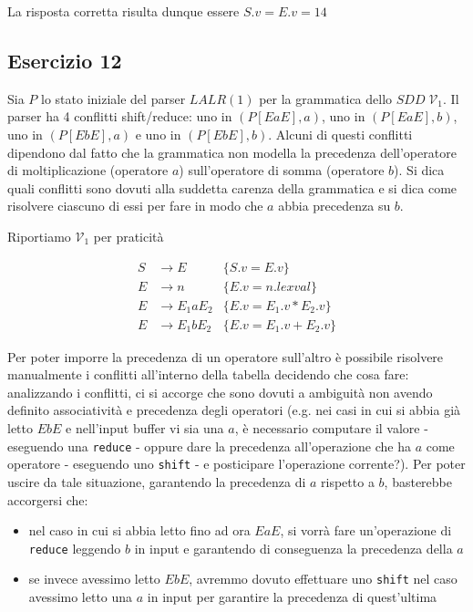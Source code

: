\documentclass[class=book, crop=false, oneside, 12pt]{standalone}
\begin{document}
La risposta corretta risulta dunque essere \(S.v = E.v = 14\)

\subsection{Esercizio 12}

Sia \(P\) lo  stato  iniziale  del  parser  \(LALR(1)\)  per  la  grammatica  dello  \(SDD \; \mathcal{V}_1\). Il parser ha 4  conflitti shift/reduce:  uno in \((P[EaE],a)\), uno in \((P[EaE],b)\), uno in \((P[EbE],a)\) e uno in \((P[EbE],b)\).   Alcuni di  questi  conflitti  dipendono  dal  fatto  che  la  grammatica  non  modella  la  precedenza  dell'operatore  di moltiplicazione (operatore \(a\)) sull'operatore di somma (operatore \(b\)).  Si dica quali conflitti sono dovuti alla suddetta carenza della grammatica e si dica come risolvere ciascuno di essi per fare in modo che \(a\) abbia precedenza su \(b\).

Riportiamo \(\mathcal{V}_1\) per praticità

\begin{align*}
    S &\to E &\{S.v = E.v\} \\
    E &\to n &\{E.v = n.lexval\} \\
    E &\to E_1 a E_2 &\{E.v = E_1.v * E_2.v\} \\
    E &\to E_1 b E_2 &\{E.v = E_1.v + E_2.v\} 
\end{align*}

Per poter imporre la precedenza di un operatore sull'altro è possibile risolvere manualmente i conflitti all'interno della tabella decidendo che cosa fare: analizzando i conflitti, ci si accorge che sono dovuti a ambiguità non avendo definito associatività e precedenza degli operatori (e.g. nei casi in cui si abbia già letto \(EbE\) e nell'input buffer vi sia una \(a\), è necessario computare il valore - eseguendo una \texttt{reduce} - oppure dare la precedenza all'operazione che ha \(a\) come operatore - eseguendo uno \texttt{shift} - e posticipare l'operazione corrente?). Per poter uscire da tale situazione, garantendo la precedenza di \(a\) rispetto a \(b\), basterebbe accorgersi che:

\begin{itemize}
    \item nel caso in cui si abbia letto fino ad ora \(EaE\), si vorrà fare un'operazione di \texttt{reduce} leggendo \(b\) in input e garantendo di conseguenza la precedenza della \(a\)
    \item se invece avessimo letto \(EbE\), avremmo dovuto effettuare uno \texttt{shift} nel caso avessimo letto una \(a\) in input per garantire la precedenza di quest'ultima
\end{itemize}
\end{document}
